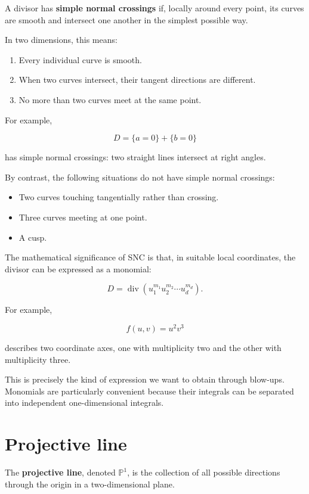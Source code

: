 \documentclass[12pt]{article}
\begin{document}
A divisor has \textbf{simple normal crossings} if, locally around every
point, its curves are smooth and intersect one another in the simplest
possible way.

In two dimensions, this means:

\begin{enumerate}
\def\labelenumi{\arabic{enumi}.}
\item
  Every individual curve is smooth.
\item
  When two curves intersect, their tangent directions are different.
\item
  No more than two curves meet at the same point.
\end{enumerate}

For example,

\[
D=\{a=0\}+\{b=0\}
\]

has simple normal crossings: two straight lines intersect at right
angles.

By contrast, the following situations do not have simple normal
crossings:

\begin{itemize}
\item
  Two curves touching tangentially rather than crossing.
\item
  Three curves meeting at one point.
\item
  A cusp.
\end{itemize}

The mathematical significance of SNC is that, in suitable local
coordinates, the divisor can be expressed as a monomial:

\[
D=\operatorname{div}(u_1^{m_1}u_2^{m_2}\cdots u_d^{m_d}).
\]

For example,

\[
f(u,v)=u^2v^3
\]

describes two coordinate axes, one with multiplicity two and the other
with multiplicity three.

This is precisely the kind of expression we want to obtain through
blow-ups. Monomials are particularly convenient because their integrals
can be separated into independent one-dimensional integrals.

\newpage
\section{Projective line}\label{projective-line}

The \textbf{projective line}, denoted \(\mathbb P^1\), is the collection
of all possible directions through the origin in a two-dimensional
plane.
\end{document}
